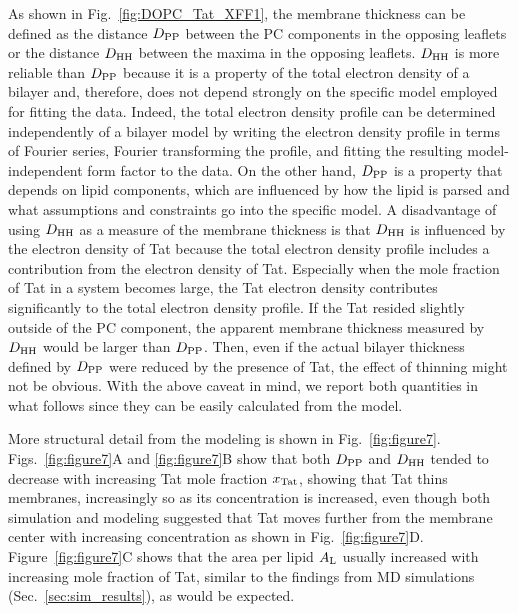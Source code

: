 As shown in Fig.~\ref{fig:DOPC_Tat_XFF1}, the membrane thickness can be defined
as the distance $D_\textrm{PP}$ between the PC components in the opposing leaflets
or the distance $D_\textrm{HH}$ between the maxima in the opposing leaflets. $D_\textrm{HH}$
is more reliable than $D_\textrm{PP}$ because it is a property of the total 
electron density of a bilayer and, therefore, does not depend strongly on the 
specific model employed for fitting the data. Indeed, the total electron
density profile can be determined independently of a bilayer model 
by writing the electron density profile in terms of Fourier series, Fourier transforming
the profile, and fitting the resulting model-independent
form factor to the data. On the other hand, $D_\textrm{PP}$ is a property that
depends on lipid components, which are influenced by how the lipid is parsed 
and what assumptions and constraints go into the specific model.
A disadvantage of using $D_\textrm{HH}$ as a measure of the membrane thickness is
that $D_\textrm{HH}$ is influenced by the electron density of Tat because 
the total electron density profile includes a contribution from the electron density of Tat. 
Especially when the mole fraction of Tat in a system becomes large, 
the Tat electron density contributes significantly to the total electron 
density profile. If the Tat resided slightly 
outside of the PC component, the apparent membrane thickness measured by $D_\textrm{HH}$
would be larger than $D_\textrm{PP}$. Then, even if the actual bilayer thickness defined by $D_\textrm{PP}$ 
were reduced by the presence of Tat, the effect of thinning might not be obvious. 
With the above caveat in mind, we report both quantities in what follows
since they can be easily calculated from the model.

More structural detail from the modeling is shown in Fig.~\ref{fig:figure7}. 
Figs.~\ref{fig:figure7}A and \ref{fig:figure7}B show that both $D_\textrm{PP}$ and $D_\textrm{HH}$ tended to
decrease with increasing Tat mole fraction $x_\textrm{Tat}$, showing that Tat thins membranes,
increasingly so as its concentration is increased, even though both simulation and modeling
suggested that Tat moves further from the membrane center with increasing concentration as
shown in Fig.~\ref{fig:figure7}D. Figure~\ref{fig:figure7}C shows that the area per lipid 
$A_\textrm{L}$ usually increased with increasing
mole fraction of Tat, similar to the findings from MD simulations (Sec.~\ref{sec:sim_results}), 
as would be expected. 

